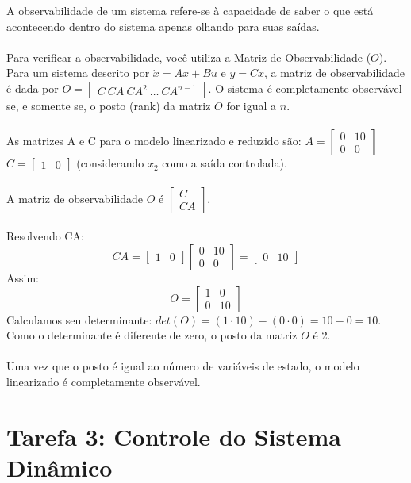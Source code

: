 \documentclass[a4paper,11pt]{article}
\begin{document}
A observabilidade de um sistema refere-se à capacidade de saber o que está acontecendo dentro do sistema apenas olhando para suas saídas.
\\\\
Para verificar a observabilidade, você utiliza a Matriz de Observabilidade ($O$). Para um sistema descrito por $\dot{x} = Ax + Bu$ e $y = Cx$, a matriz de observabilidade é dada por $O = \begin{bmatrix} C \ CA \ CA^2 \ \dots \ CA^{n-1} \end{bmatrix}$. O sistema é completamente observável se, e somente se, o posto (rank) da matriz $O$ for igual a $n$.
\\\\
As matrizes A e C para o modelo linearizado e reduzido são: $A = \begin{bmatrix} 0 & 10 \\ 0 & 0 \end{bmatrix}$ $C = \begin{bmatrix} 1 & 0 \end{bmatrix}$ (considerando $x_2$ como a saída controlada).
\\\\
A matriz de observabilidade $O$ é $\begin{bmatrix} C \\ CA \end{bmatrix}$.
\\\\
Resolvendo CA:
\[
    CA = \begin{bmatrix} 1 & 0 \end{bmatrix} \begin{bmatrix} 0 & 10 \\ 0 & 0 \end{bmatrix} = \begin{bmatrix} 0 & 10 \end{bmatrix}
\]
Assim:
\[
    O = \begin{bmatrix} 1 & 0 \\ 0 & 10 \end{bmatrix}
\]
Calculamos seu determinante: $det(O) = (1 \cdot 10) - (0 \cdot 0) = 10 - 0 = 10$. Como o determinante é diferente de zero, o posto da matriz $O$ é 2. 
\\\\
Uma vez que o posto é igual ao número de variáveis de estado, o modelo linearizado é completamente observável.

\section*{\sc Tarefa 3: Controle do Sistema Dinâmico}
\end{document}
